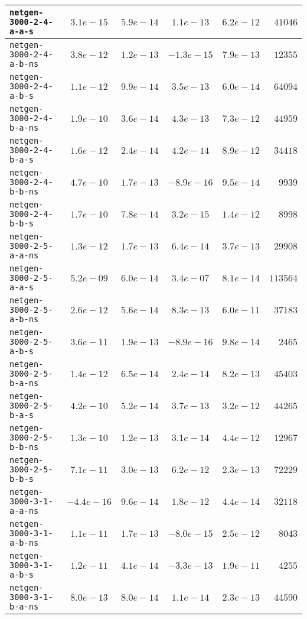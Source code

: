 \begin{center}
\begin{longtable}{|l || c | c | c | c | r|}
\hline
\texttt{netgen-3000-2-4-a-a-s} & $3.1e-15$ & $5.9e-14$ & $1.1e-13$ & $6.2e-12$ & $41046$ \\
\hline
\texttt{netgen-3000-2-4-a-b-ns} & $3.8e-12$ & $1.2e-13$ & $-1.3e-15$ & $7.9e-13$ & $12355$ \\
\hline
\texttt{netgen-3000-2-4-a-b-s} & $1.1e-12$ & $9.9e-14$ & $3.5e-13$ & $6.0e-14$ & $64094$ \\
\hline
\texttt{netgen-3000-2-4-b-a-ns} & $1.9e-10$ & $3.6e-14$ & $4.3e-13$ & $7.3e-12$ & $44959$ \\
\hline
\texttt{netgen-3000-2-4-b-a-s} & $1.6e-12$ & $2.4e-14$ & $4.2e-14$ & $8.9e-12$ & $34418$ \\
\hline
\texttt{netgen-3000-2-4-b-b-ns} & $4.7e-10$ & $1.7e-13$ & $-8.9e-16$ & $9.5e-14$ & $9939$ \\
\hline
\texttt{netgen-3000-2-4-b-b-s} & $1.7e-10$ & $7.8e-14$ & $3.2e-15$ & $1.4e-12$ & $8998$ \\
\hline
\texttt{netgen-3000-2-5-a-a-ns} & $1.3e-12$ & $1.7e-13$ & $6.4e-14$ & $3.7e-13$ & $29908$ \\
\hline
\texttt{netgen-3000-2-5-a-a-s} & $5.2e-09$ & $6.0e-14$ & $3.4e-07$ & $8.1e-14$ & $113564$ \\
\hline
\texttt{netgen-3000-2-5-a-b-ns} & $2.6e-12$ & $5.6e-14$ & $8.3e-13$ & $6.0e-11$ & $37183$ \\
\hline
\texttt{netgen-3000-2-5-a-b-s} & $3.6e-11$ & $1.9e-13$ & $-8.9e-16$ & $9.8e-14$ & $2465$ \\
\hline
\texttt{netgen-3000-2-5-b-a-ns} & $1.4e-12$ & $6.5e-14$ & $2.4e-14$ & $8.2e-13$ & $45403$ \\
\hline
\texttt{netgen-3000-2-5-b-a-s} & $4.2e-10$ & $5.2e-14$ & $3.7e-13$ & $3.2e-12$ & $44265$ \\
\hline
\texttt{netgen-3000-2-5-b-b-ns} & $1.3e-10$ & $1.2e-13$ & $3.1e-14$ & $4.4e-12$ & $12967$ \\
\hline
\texttt{netgen-3000-2-5-b-b-s} & $7.1e-11$ & $3.0e-13$ & $6.2e-12$ & $2.3e-13$ & $72229$ \\
\hline
\texttt{netgen-3000-3-1-a-a-ns} & $-4.4e-16$ & $9.6e-14$ & $1.8e-12$ & $4.4e-14$ & $32118$ \\
\hline
\texttt{netgen-3000-3-1-a-b-ns} & $1.1e-11$ & $1.7e-13$ & $-8.0e-15$ & $2.5e-12$ & $8043$ \\
\hline
\texttt{netgen-3000-3-1-a-b-s} & $1.2e-11$ & $4.1e-14$ & $-3.3e-13$ & $1.9e-11$ & $4255$ \\
\hline
\texttt{netgen-3000-3-1-b-a-ns} & $8.0e-13$ & $8.0e-14$ & $1.1e-14$ & $2.3e-13$ & $44590$ \\

\end{longtable}
\end{center}
